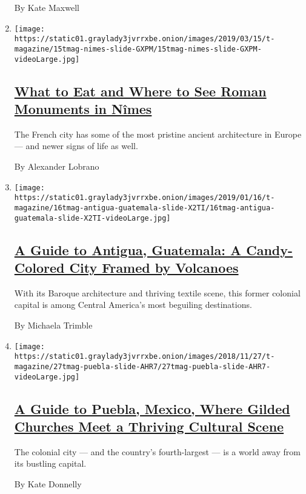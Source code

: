 \begin{enumerate}
  By Kate Maxwell
\item
  \texttt{[image: https://static01.graylady3jvrrxbe.onion/images/2019/03/15/t-magazine/15tmag-nimes-slide-GXPM/15tmag-nimes-slide-GXPM-videoLarge.jpg]}

  \hypertarget{what-to-eat-and-where-to-see-roman-monuments-in-nuxeemes}{%
  \subsection{\texorpdfstring{\href{/2019/03/15/t-magazine/nimes-france-travel-guide.html}{What
  to Eat and Where to See Roman Monuments in
  Nîmes}}{What to Eat and Where to See Roman Monuments in Nîmes}}\label{what-to-eat-and-where-to-see-roman-monuments-in-nuxeemes}}

  The French city has some of the most pristine ancient architecture in
  Europe --- and newer signs of life as well.

  By Alexander Lobrano
\item
  \texttt{[image: https://static01.graylady3jvrrxbe.onion/images/2019/01/16/t-magazine/16tmag-antigua-guatemala-slide-X2TI/16tmag-antigua-guatemala-slide-X2TI-videoLarge.jpg]}

  \hypertarget{a-guide-to-antigua-guatemala-a-candy-colored-city-framed-by-volcanoes}{%
  \subsection{\texorpdfstring{\href{/2019/01/21/t-magazine/antigua-guatemala-travel-guide.html}{A
  Guide to Antigua, Guatemala: A Candy-Colored City Framed by
  Volcanoes}}{A Guide to Antigua, Guatemala: A Candy-Colored City Framed by Volcanoes}}\label{a-guide-to-antigua-guatemala-a-candy-colored-city-framed-by-volcanoes}}

  With its Baroque architecture and thriving textile scene, this former
  colonial capital is among Central America's most beguiling
  destinations.

  By Michaela Trimble
\item
  \texttt{[image: https://static01.graylady3jvrrxbe.onion/images/2018/11/27/t-magazine/27tmag-puebla-slide-AHR7/27tmag-puebla-slide-AHR7-videoLarge.jpg]}

  \hypertarget{a-guide-to-puebla-mexico-where-gilded-churches-meet-a-thriving-cultural-scene}{%
  \subsection{\texorpdfstring{\href{/2018/11/27/t-magazine/puebla-mexico-travel-guide.html}{A
  Guide to Puebla, Mexico, Where Gilded Churches Meet a Thriving
  Cultural
  Scene}}{A Guide to Puebla, Mexico, Where Gilded Churches Meet a Thriving Cultural Scene}}\label{a-guide-to-puebla-mexico-where-gilded-churches-meet-a-thriving-cultural-scene}}

  The colonial city --- and the country's fourth-largest --- is a world
  away from its bustling capital.

  By Kate Donnelly
\end{enumerate}

